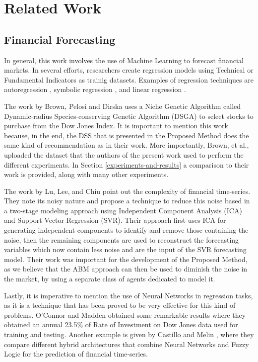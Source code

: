 \chapter{Related Work}
\label{chapter:related-work}

\section{Financial Forecasting}
\label{section:financial-forecasting}

In general, this work involves the use of Machine Learning to forecast financial
markets. In several efforts, researchers create regression models using
Technical or Fundamental Indicators as trainig datasets. Examples of regression
techniques are autoregression \cite{burg1968new}, symbolic regression
\cite{billard2002symbolic}, and linear regression \cite{kutner2004applied}.

The work by Brown, Pelosi and Dirska \cite{brown2013dynamic} uses a Niche
Genetic Algorithm called Dynamic-radius Species-conserving Genetic Algorithm
(DSGA) to select stocks to purchase from the Dow Jones Index. It is important to
mention this work because, in the end, the DSS that is presented in the Proposed
Method does the same kind of recommendation as in their work. More importantly,
Brown, et al., uploaded the dataset that the authors of the present work used to
perform the different experiments. In Section \ref{experiments-and-results} a
comparison to their work is provided, along with many other experiments.

The work by Lu, Lee, and Chiu \cite{Lu2009} point out the complexity of
financial time-series. They note its noisy nature and propose a technique to
reduce this noise based in a two-stage modeling approach using Independent
Component Analysis (ICA) and Support Vector Regression (SVR). Their approach
first uses ICA for generating independent components to identify and remove
those containing the noise, then the remaining components are used to
reconstruct the forecasting variables which now contain less noise and are the
input of the SVR forecasting model. Their work was important for the development
of the Proposed Method, as we believe that the ABM approach can then be used to
diminish the noise in the market, by using a separate class of agents dedicated
to model it.

Lastly, it is imperative to mention the use of Neural Networks in regression
tasks, as it is a technique that has been proved to be very effective for this
kind of problems. O'Connor and Madden \cite{Connor2005} obtained some remarkable
results where they obtained an annual 23.5\% of Rate of Investment on Dow Jones
data used for training and testing. Another example is given by Castillo and
Melin \cite{castillo2001simulation}, where they compare different hybrid
architectures that combine Neural Networks and Fuzzy Logic for the prediction of
financial time-series.

